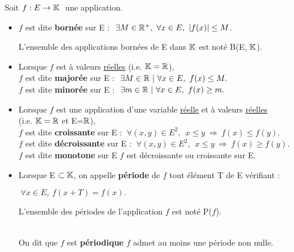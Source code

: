 \noindent Soit \(f : E\to \mathbb{K}\ \) une application.
\begin{itemize}[label=•]
    \item \(f\) est dite \textbf{bornée} sur E \ssi : \(\ \exists M\in \RR ^+, \ \forall x\in E, \ |f(x)|\leq M\). \\
    \begin{small}L'ensemble des applications bornées de E dans \(\mathbb{K}\) est noté B(E,\(\ \mathbb{K}\)).\end{small}\vspace{0.4cm}
    
    \item Lorsque \(f\) est à valeurs \underline{réelles} (i.e. \(\mathbb{K}=\mathbb{R}\)), \\
    \(f\) est dite \textbf{majorée} sur E \ssi : \(\ \exists M\in \RR \ | \ \forall x \in E,\ f(x)\leq M.\) \\
    \(f\) est dite \textbf{minorée} sur E \ssi : \(\ \exists m\in \RR \ | \ \forall x \in E,\ f(x)\geq m.\)\vspace{0.4cm}
     
    \item Lorsque \(f\) est une application d'une variable \underline{réelle} et à valeurs \underline{réelles} \\
    (i.e. \(\mathbb{K}=\mathbb{R}\) et E=\(\mathbb{R}\)), \\
    \(f\) est dite \textbf{croissante} sur E \ssi : \(\ \forall (x,y)\in E^2,\ \ x\leq y\ \Rightarrow \ f(x)\leq f(y).\) \\
    \(f\) est dite \textbf{décroissante} sur E \ssi : \(\ \forall (x,y)\in E^2,\ \ x\leq y\ \Rightarrow \ f(x)\geq f(y).\) \\
    \(f\) est dite \textbf{monotone} sur E \ssi \(f\) est décroissante ou croissante sur E.\newpage
    
    \item Lorsque E\(\ \subset \mathbb{K}\), on appelle \textbf{période} de \(f\) tout élément T de E vérifiant :\vspace{-0.3cm}
    \begin{center}\(\ \forall x\in E,\ f(x+T)=f(x).\)\end{center}\vspace{-0.3cm}
    \begin{small}L'ensemble des périodes de l'application \(f\) est noté P(\(f\)).\end{small} \\
    On dit que \(f\) est \textbf{périodique} \ssi \(f\) admet au moins une période non nulle.\vspace{0.4cm}


\end{itemize}
